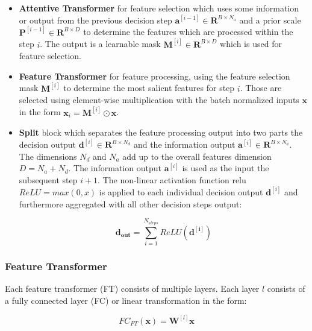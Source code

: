 \documentclass[../main.tex]{subfiles}
\begin{document}
\begin{itemize}
    \item \textbf{Attentive Transformer} for feature selection which uses some information or output from the previous decision step $\mathbf{a}^{[i-1]} \in \mathbf{R}^{B\times N_a}$ and a prior scale $\mathbf{P}^{[i-1]} \in \mathbf{R}^{B\times D}$ to determine the features which are processed within the step $i$. The output is a learnable mask $\mathbf{M}^{[i]} \in \mathbf{R}^{B\times D}$ which is used for feature selection.

    \item \textbf{Feature Transformer} for feature processing, using the feature selection mask $\mathbf{M}^{[i]}$ to determine the most salient features for step $i$. Those are selected  using element-wise multiplication with the batch normalized inputs $\mathbf{x}$ in the form $\mathbf{x}_i=\mathbf{M}^{[i]} \odot \mathbf{x}$. 

    \item \textbf{Split} block which separates the feature processing output into two parts the decision output $\mathbf{d}^{[i]} \in \mathbf{R}^{B\times N_d}$ and the information output $\mathbf{a}^{[i]} \in \mathbf{R}^{B\times N_a}$. The dimensions $N_d$ and $N_a$ add up to the overall features dimension $D=N_a+N_d$. The information output $\mathbf{a}^{[i]}$ is used as the input the subsequent step $i+1$. The non-linear activation function \acs{relu} $ReLU = max(0, x)$ is applied to each individual decision output $\mathbf{d}^{[i]}$ and furthermore aggregated with all other decision steps output:

    \begin{equation} \label{eq:d_out}
        \mathbf{d_{out}} = \sum_{i=1}^{N_{steps}} ReLU(\mathbf{d^{[i]}})
    \end{equation}    
\end{itemize}

\subsubsection{Feature Transformer} \label{sssec:feature_transformer}

Each feature transformer (FT) consists of multiple layers. Each layer $l$ consists of a fully connected layer (FC) or linear transformation in the form:

\begin{equation}
    FC_{FT}(\mathbf{x}) = \mathbf{W}^{[l]} \mathbf{x}
\end{equation}
\end{document}
